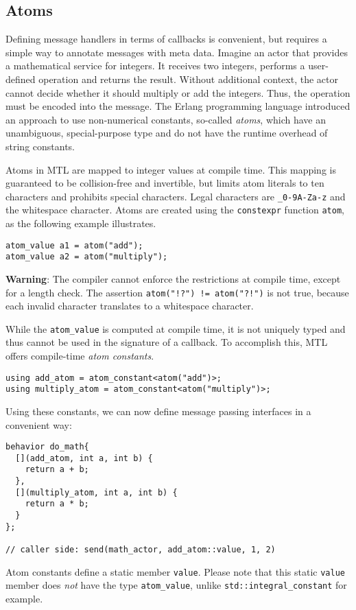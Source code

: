 \clearpage
\subsection{Atoms}
\label{atom}

Defining message handlers in terms of callbacks is convenient, but requires a
simple way to annotate messages with meta data. Imagine an actor that provides
a mathematical service for integers. It receives two integers, performs a
user-defined operation and returns the result. Without additional context, the
actor cannot decide whether it should multiply or add the integers. Thus, the
operation must be encoded into the message. The Erlang programming language
introduced an approach to use non-numerical constants, so-called
\textit{atoms}, which have an unambiguous, special-purpose type and do not have
the runtime overhead of string constants.

Atoms in MTL are mapped to integer values at compile time. This mapping is
guaranteed to be collision-free and invertible, but limits atom literals to ten
characters and prohibits special characters. Legal characters are
\lstinline^_0-9A-Za-z^ and the whitespace character. Atoms are created using
the \lstinline^constexpr^ function \lstinline^atom^, as the following example
illustrates.

\begin{lstlisting}
atom_value a1 = atom("add");
atom_value a2 = atom("multiply");
\end{lstlisting}

\textbf{Warning}: The compiler cannot enforce the restrictions at compile time,
except for a length check. The assertion \lstinline^atom("!?") != atom("?!")^
is not true, because each invalid character translates to a whitespace
character.

While the \lstinline^atom_value^ is computed at compile time, it is not
uniquely typed and thus cannot be used in the signature of a callback. To
accomplish this, MTL offers compile-time \emph{atom constants}.

\begin{lstlisting}
using add_atom = atom_constant<atom("add")>;
using multiply_atom = atom_constant<atom("multiply")>;
\end{lstlisting}

Using these constants, we can now define message passing interfaces in a
convenient way:

\begin{lstlisting}
behavior do_math{
  [](add_atom, int a, int b) {
    return a + b;
  },
  [](multiply_atom, int a, int b) {
    return a * b;
  }
};

// caller side: send(math_actor, add_atom::value, 1, 2)
\end{lstlisting}

Atom constants define a static member \lstinline^value^. Please note that this
static \lstinline^value^ member does \emph{not} have the type
\lstinline^atom_value^, unlike \lstinline^std::integral_constant^ for example.
